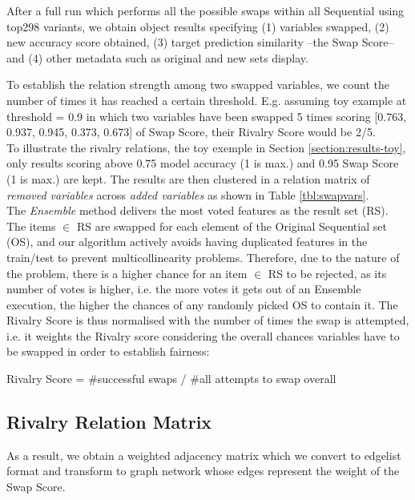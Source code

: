 After a full run which performs all the possible swaps within all Sequential using top298 variants, we obtain object results specifying (1) variables swapped, (2) new accuracy score obtained, (3) target prediction similarity --the Swap Score-- and (4) other metadata such as original and new sets display.

To establish the relation strength among two swapped variables, we count the number of times it has reached a certain threshold. E.g. assuming toy example at threshold = 0.9 in which two variables have been swapped 5 times scoring [0.763, 0.937, 0.945, 0.373, 0.673] of Swap Score, their Rivalry Score would be 2/5.
\\

To illustrate the rivalry relations, the toy exemple in Section \ref{section:results-toy}, only results scoring above 0.75 model accuracy (1 is max.) and 0.95 Swap Score (1 is max.) are kept. The results are then clustered in a relation matrix of \textit{removed variables} across \textit{added variables} as shown in Table \ref{tbl:swapvars}. 
\\

The \emph{Ensemble} method delivers the most voted features as the result set (RS). The items  $\in$  RS are swapped for each element of the Original Sequential set (OS), and our algorithm actively avoids having duplicated features in the train/test to prevent multicollinearity problems. Therefore, due to the nature of the problem, there is a higher chance for an item  $\in$  RS to be rejected, as its number of votes is higher, i.e. the more votes it gets out of an Ensemble execution, the higher the chances of any randomly picked OS to contain it. The Rivalry Score is thus normalised with the number of times the swap is attempted, i.e. it weights the Rivalry score considering the overall chances variables have to be swapped in order to establish fairness:

\begin{center}
    Rivalry Score = \#successful swaps / \#all attempts to swap overall
\end{center}


\subsection{Rivalry Relation Matrix}
As a result, we obtain a weighted adjacency matrix which we convert to edgelist format and transform to graph network whose edges represent the weight of the Swap Score.
\\

